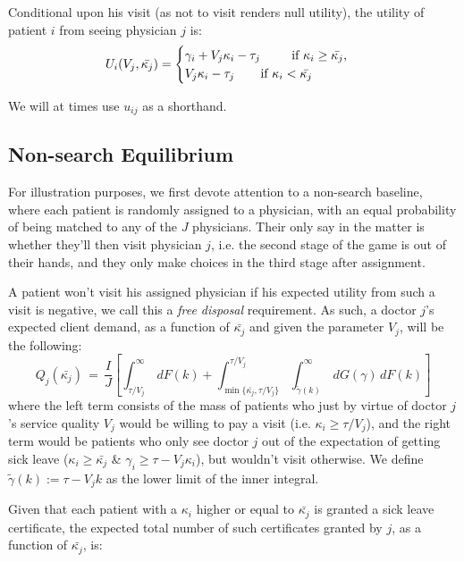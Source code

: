 \documentclass[../main.tex]{subfiles}
\begin{document}
Conditional upon his visit (as not to visit renders null utility), the utility of patient $i$ from seeing physician $j$ is:
\[
    U_i(V_j,\bar{\kappa_j}) =\begin{cases}
    \gamma_i + V_j \kappa_i - \tau_j \text{  \hspace{0.65cm} if $\kappa_i \geq \bar{\kappa_j}$,} \\
    V_j \kappa_i - \tau_j \text{  \hspace{0.5cm} if $\kappa_i < \bar{\kappa_j}$}
    \end{cases}
\]

We will at times use $u_{ij}$ as a shorthand.

\subsection{Non-search Equilibrium}

For illustration purposes, we first devote attention to a non-search baseline, where each patient is randomly assigned to a physician, with an equal probability of being matched to any of the $J$ physicians. Their only say in the matter is whether they'll then visit physician $j$, i.e. the second stage of the game is out of their hands, and they only make choices in the third stage after assignment.

A patient won't visit his assigned physician if his expected utility from such a visit is negative, we call this a \textit{free disposal} requirement. As such, a doctor $j$’s expected client demand, as a function of $\bar{\kappa_j}$ and given the parameter $V_j$, will be the following:
\begin{equation}
    Q_j(\bar{\kappa_j}) \,=\, \frac{I}{J}\left[ \int_{\tau/V_j}^{\infty}\,dF(k) +  \int_{\min\{\bar{\kappa_j},\tau/V_j\}}^{\tau/V_j} \int_{\tilde{\gamma}(k)}^{\infty} \,dG(\gamma) \,dF(k) \right] \tag{N.1}\label{eq:ns_Q}
\end{equation}
where the left term consists of the mass of patients who just by virtue of doctor $j$’s service quality $V_j$ would be willing to pay a visit (i.e. $\kappa_i \geq \tau/V_j$), and the right term would be patients who only see doctor $j$ out of the expectation of getting sick leave ($\kappa_i \geq \bar{\kappa_j}$ \& $\gamma_i \geq \tau - V_j \kappa_i$), but wouldn’t visit otherwise. We define $\tilde{\gamma}(k) := \tau - V_j k$ as the lower limit of the inner integral.

Given that each patient with a $\kappa_i$ higher or equal to $\bar{\kappa_j}$ is granted a sick leave certificate, the expected total number of such certificates granted by $j$, as a function of $\bar{\kappa_j}$, is:
\end{document}
